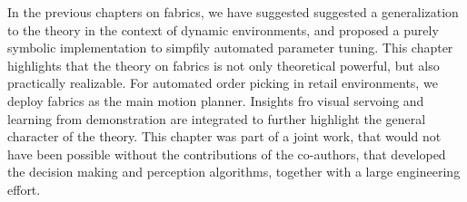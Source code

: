 In the previous chapters on \ac{fabrics}, we have suggested suggested a
generalization to the theory in the context of dynamic environments, and
proposed a purely symbolic implementation to simpfily automated parameter
tuning. This chapter highlights that the theory on \ac{fabrics} is not only 
theoretical powerful, but also practically realizable. For automated order
picking in retail environments, we deploy \ac{fabrics} as the main motion
planner. Insights fro visual servoing and learning from demonstration are
integrated to further highlight the general character of the theory. This
chapter was part of a joint work, that would not have been possible without the
contributions of the co-authors, that developed the decision making and
perception algorithms, together with a large engineering effort.

